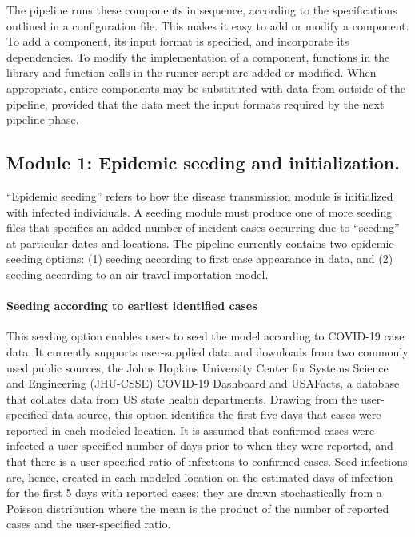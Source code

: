 The pipeline runs these components in sequence, according to the specifications outlined in a configuration file. This makes it easy to add or modify a component. To add a component, its input format is specified, and incorporate its dependencies. To modify the implementation of a component, functions in the library and function calls in the runner script are added or modified. When appropriate, entire components may be substituted with data from outside of the pipeline, provided that the data meet the input formats required by the next pipeline phase.

\subsection{Module 1: Epidemic seeding and initialization.} 

“Epidemic seeding” refers to how the disease transmission module is initialized with infected individuals. A seeding module must produce one of more seeding files that specifies an added number of incident cases occurring due to “seeding” at particular dates and locations. The pipeline currently contains two epidemic seeding options: (1) seeding according to first case appearance in data, and (2) seeding according to an air travel importation model. 

\paragraph{Seeding according to earliest identified cases} This seeding option enables users to seed the model according to COVID-19 case data. It currently supports user-supplied data and downloads from two commonly used public sources, the Johns Hopkins University Center for Systems Science and Engineering (JHU-CSSE) COVID-19 Dashboard\cite{Dong:InteractiveWebbasedDashboard:2020} and USAFacts, a database that collates data from US state health departments\cite{USAFacts:USCOVID19Cases:2021}. Drawing from the user-specified data source, this option identifies the first five days that cases were reported in each modeled location. It is assumed that confirmed cases were infected a user-specified number of days prior to when they were reported, and that there is a user-specified ratio of infections to confirmed cases. Seed infections are, hence, created in each modeled location on the estimated days of infection for the first 5 days with reported cases; they are drawn stochastically from a Poisson distribution where the mean is the product of the number of reported cases and the user-specified ratio. 

